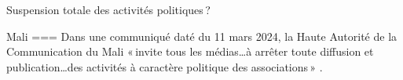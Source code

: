 Suspension totale des activités politiques ?

Mali
===
Dans une communiqué daté du 11 mars 2024, la Haute Autorité de la Communication du Mali « invite tous les médias…à arrêter toute diffusion et publication…des activités à caractère politique des associations » \parencite{coulibaly2024}.